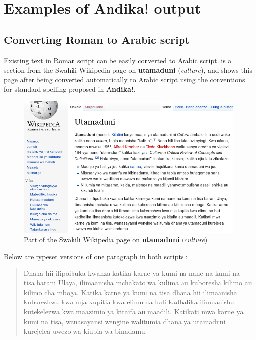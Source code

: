 \chapter{Examples of \textbf{Andika!} output}
\label{ch:2}


\section{Converting Roman to Arabic script}

Existing text in Roman script can be easily converted to Arabic script.   is a section from the Swahili Wikipedia page on \textbf{utamaduni} (\textit{culture}), and  shows this page after being converted automatically to Arabic script using the conventions for standard spelling proposed in \textbf{Andika!}.  

\begin{figure}[H]
 \centering
 \includegraphics[keepaspectratio=true, scale=0.8]{./images/utamaduni_rom.png}
 \caption{Part of the Swahili Wikipedia page on \textbf{utamaduni} (\textit{culture})}
 \label{fig:wikiR}
\end{figure}

Below are typeset versions of one paragraph in both scripts :

\begin{quotation}
Dhana hii ilipoibuka kwanza katika karne ya kumi na nane na kumi na tisa barani Ulaya, ilimaanisha mchakato wa kulima au kuboresha kilimo au kilimo cha mboga. Katika karne ya kumi na tisa dhana hii ilimaanisha kuboreshwa kwa mja kupitia kwa elimu na hali kadhalika ilimaanisha kutekelezwa kwa maazimio ya kitaifa au maadili. Katikati mwa karne ya kumi na tisa, wanasayansi wengine walitumia dhana ya utamaduni kurejelea uwezo wa kiubia wa binadamu.
\end{quotation}

